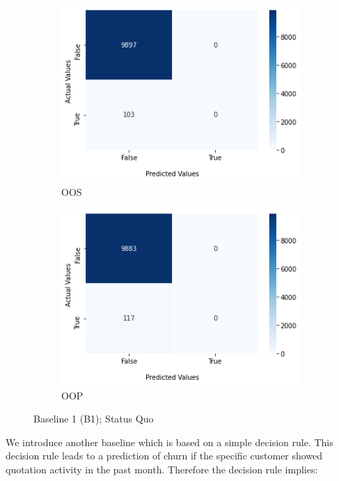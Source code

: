 \documentclass[12pt,titlepage]{article}
\begin{document}
\begin{figure}
\centering
\begin{subfigure}{.5\textwidth}
  \centering
  \includegraphics[width=1\linewidth]{conf_b1_oos.png}
  \caption{OOS}
  \label{fig:conf_b1_oos}
\end{subfigure}%
\begin{subfigure}{.5\textwidth}
  \centering
  \includegraphics[width=1\linewidth]{conf_b1_oop.png}
  \caption{OOP}
  \label{fig:conf_b1_oop}
\end{subfigure}
\caption{Baseline 1 (B1); Status Quo}
\label{fig:b1}
\end{figure}

We introduce another baseline which is based on a simple decision rule. This decision rule leads to a prediction of churn if the specific customer showed quotation activity in the past month. Therefore the decision rule implies: \\
\end{document}
